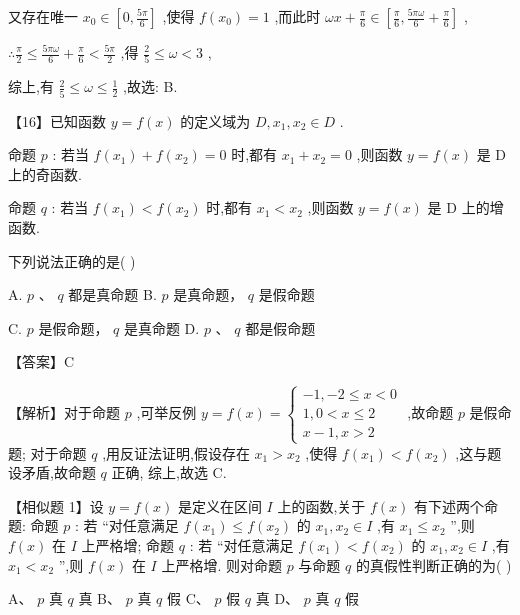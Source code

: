 \documentclass[10pt]{article}
\begin{document}
又存在唯一 \({x}_{0} \in  \left\lbrack  {0,\frac{5\pi }{6}}\right\rbrack\) ,使得 \(f\left( {x}_{0}\right)  = 1\) ,而此时 \({\omega x} + \frac{\pi }{6} \in  \left\lbrack  {\frac{\pi }{6},\frac{5\pi \omega }{6} + \frac{\pi }{6}}\right\rbrack\) ,

\(\therefore \frac{\pi }{2} \leq  \frac{5\pi \omega }{6} + \frac{\pi }{6} < \frac{5\pi }{2}\) ,得 \(\frac{2}{5} \leq  \omega  < 3\) ,

综上,有 \(\frac{2}{5} \leq  \omega  \leq  \frac{1}{2}\) ,故选: B.

【16】已知函数 \(y = f\left( x\right)\) 的定义域为 \(D,{x}_{1},{x}_{2} \in  D\) .

命题 \(p\) : 若当 \(f\left( {x}_{1}\right)  + f\left( {x}_{2}\right)  = 0\) 时,都有 \({x}_{1} + {x}_{2} = 0\) ,则函数 \(y = f\left( x\right)\) 是 \(\mathrm{D}\) 上的奇函数.

命题 \(q\) : 若当 \(f\left( {x}_{1}\right)  < f\left( {x}_{2}\right)\) 时,都有 \({x}_{1} < {x}_{2}\) ,则函数 \(y = f\left( x\right)\) 是 \(\mathrm{D}\) 上的增函数.

下列说法正确的是( )

A. \(p\) 、 \(q\) 都是真命题 B. \(p\) 是真命题， \(q\) 是假命题

C. \(p\) 是假命题， \(q\) 是真命题 D. \(p\) 、 \(q\) 都是假命题

【答案】C

【解析】对于命题 \(p\) ,可举反例 \(y = f\left( x\right)  = \left\{  \begin{array}{l}  - 1, - 2 \leq  x < 0 \\  1,0 < x \leq  2 \\  x - 1,x > 2 \end{array}\right.\) ,故命题 \(p\) 是假命题; 对于命题 \(q\) ,用反证法证明,假设存在 \({x}_{1} > {x}_{2}\) ,使得 \(f\left( {x}_{1}\right)  < f\left( {x}_{2}\right)\) ,这与题设矛盾,故命题 \(q\) 正确, 综上,故选 C.

【相似题 1】设 \(y = f\left( x\right)\) 是定义在区间 \(I\) 上的函数,关于 \(f\left( x\right)\) 有下述两个命题: 命题 \(p\) : 若 “对任意满足 \(f\left( {x}_{1}\right)  \leq  f\left( {x}_{2}\right)\) 的 \({x}_{1},{x}_{2} \in  I\) ,有 \({x}_{1} \leq  {x}_{2}\) ”,则 \(f\left( x\right)\) 在 \(I\) 上严格增; 命题 \(q\) : 若 “对任意满足 \(f\left( {x}_{1}\right)  < f\left( {x}_{2}\right)\) 的 \({x}_{1},{x}_{2} \in  I\) ,有 \({x}_{1} < {x}_{2}\) ”,则 \(f\left( x\right)\) 在 \(I\) 上严格增. 则对命题 \(p\) 与命题 \(q\) 的真假性判断正确的为( )

A、 \(p\) 真 \(q\) 真 B、 \(p\) 真 \(q\) 假 C、 \(p\) 假 \(q\) 真 D、 \(p\) 真 \(q\) 假
\end{document}
